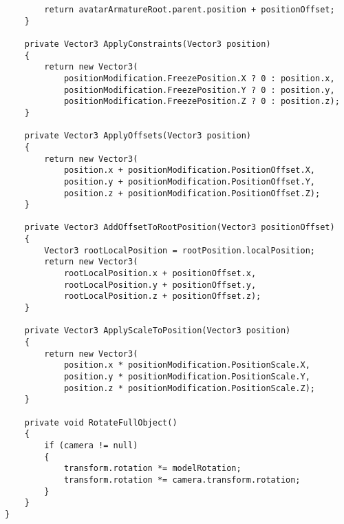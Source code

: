 \begin{verbatim}
        return avatarArmatureRoot.parent.position + positionOffset;
    }

    private Vector3 ApplyConstraints(Vector3 position)
    {
        return new Vector3(
            positionModification.FreezePosition.X ? 0 : position.x,
            positionModification.FreezePosition.Y ? 0 : position.y,
            positionModification.FreezePosition.Z ? 0 : position.z);
    }

    private Vector3 ApplyOffsets(Vector3 position)
    {
        return new Vector3(
            position.x + positionModification.PositionOffset.X,
            position.y + positionModification.PositionOffset.Y,
            position.z + positionModification.PositionOffset.Z);
    }

    private Vector3 AddOffsetToRootPosition(Vector3 positionOffset)
    {
        Vector3 rootLocalPosition = rootPosition.localPosition;
        return new Vector3(
            rootLocalPosition.x + positionOffset.x,
            rootLocalPosition.y + positionOffset.y,
            rootLocalPosition.z + positionOffset.z);
    }

    private Vector3 ApplyScaleToPosition(Vector3 position)
    {
        return new Vector3(
            position.x * positionModification.PositionScale.X,
            position.y * positionModification.PositionScale.Y,
            position.z * positionModification.PositionScale.Z);
    }

    private void RotateFullObject()
    {
        if (camera != null)
        {
            transform.rotation *= modelRotation;
            transform.rotation *= camera.transform.rotation;
        }
    }
}
\end{verbatim}
